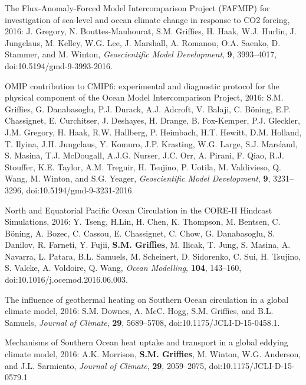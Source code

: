 \begin{etaremune}
\item The Flux-Anomaly-Forced Model Intercomparison Project (FAFMIP) for investigation of sea-level and ocean climate change in response to CO2 forcing, 2016: J. Gregory, N. Bouttes-Mauhourat, S.M. Grif\/f\/ies, H. Haak, W.J. Hurlin, J.  Jungclaus, M. Kelley, W.G. Lee, J. Marshall, A. Romanou, O.A. Saenko, D. Stammer, and M.  Winton, {\it Geoscientific Model Development},
  {\bf 9}, 3993--4017, doi:10.5194/gmd-9-3993-2016.






\item OMIP contribution to CMIP6: experimental and diagnostic protocol for the physical component of the Ocean Model Intercomparison  Project, 2016: S.M. Grif\/f\/ies, G. Danabasoglu, P.J. Durack,  A.J. Adcroft, V. Balaji, C. B\"{o}̈ning, E.P. Chassignet, E. Curchitser, J. Deshayes, H. Drange, B. Fox-Kemper, P.J. Gleckler, J.M. Gregory, H. Haak, R.W. Hallberg, P. Heimbach, H.T. Hewitt, D.M. Holland, T. Ilyina, J.H. Jungclaus, Y. Komuro, J.P. Krasting, W.G. Large, S.J. Marsland, S. Masina, T.J. McDougall, A.J.G. Nurser, J.C. Orr, A. Pirani, F. Qiao, R.J. Stouffer, K.E. Taylor, A.M. Treguir, H. Tsujino, P. Uotila, M. Valdivieso, Q. Wang,
M. Winton, and S.G. Yeager, {\it Geoscientific Model Development},
  {\bf 9}, 3231--3296, doi:10.5194/gmd-9-3231-2016.

\item North and Equatorial Pacific Ocean Circulation in the CORE-II
  Hindcast Simulations, 2016: Y. Tseng, H.Lin, H. Chen, K.  Thompson,
  M. Bentsen, C. B\"{o}ning, A. Bozec, C. Cassou, E.  Chassignet,
  C. Chow, G. Danabasoglu, S. Danilov, R. Farneti, Y. Fujii, {\bf
    S.M. Grif\/f\/ies}, M. Ilicak, T. Jung, S. Masina, A. Navarra,
  L. Patara, B.L.  Samuels, M. Scheinert, D. Sidorenko, C. Sui,
  H. Tsujino, S. Valcke, A. Voldoire, Q. Wang, {\it Ocean Modelling},
  {\bf 104}, 143--160, doi:10.1016/j.ocemod.2016.06.003.

\item The influence of geothermal heating on Southern Ocean
  circulation in a global climate model, 2016: S.M. Downes,
  A. McC. Hogg, S.M. Grif\/f\/ies, and B.L. Samuels, {\it
    Journal of Climate}, {\bf 29}, 5689--5708,
  doi:10.1175/JCLI-D-15-0458.1.

\item Mechanisms of Southern Ocean heat uptake and transport in a
  global eddying climate model, 2016: A.K. Morrison, {\bf
    S.M. Grif\/f\/ies}, M. Winton, W.G. Anderson, and J.L. Sarmiento,
  {\it Journal of Climate}, {\bf 29}, 2059--2075,
  doi:10.1175/JCLI-D-15-0579.1


\end{etaremune}

